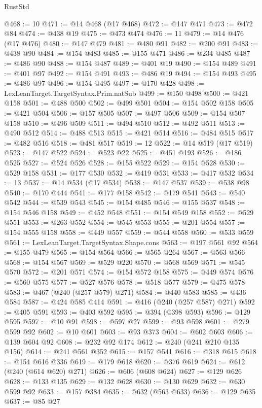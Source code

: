 \begin{lexlean}{RustStd}
\begin{coremodule}
@468 := 10
@471 := @14 @468 (@17 @468)
@472 := @147 @471
@473 := @472 @84
@474 := @438 @19
@475 := @473 @474
@476 := 11
@479 := @14 @476 (@17 @476)
@480 := @147 @479
@481 := @480 @91
@482 := @200 @91
@483 := @438 @90
@484 := @154 @483
@485 := @155 @471
@486 := @234 @485
@487 := @486 @90
@488 := @154 @487
@489 := @401 @19
@490 := @154 @489
@491 := @401 @97
@492 := @154 @491
@493 := @486 @19
@494 := @154 @493
@495 := @486 @97
@496 := @154 @495
@497 := @170 @428
@498 := LexLeanTarget.TargetSyntax.Prim.natSub
@499 := @150 @498
@500 := @421 @158
@501 := @488 @500
@502 := @499 @501
@504 := @154 @502 @158
@505 := @421 @504
@506 := @157 @505
@507 := @497 @506
@509 := @154 @507 @158
@510 := @496 @509
@511 := @494 @510
@512 := @492 @511
@513 := @490 @512
@514 := @488 @513
@515 := @421 @514
@516 := @484 @515
@517 := @482 @516
@518 := @481 @517
@519 := 12
@522 := @14 @519 (@17 @519)
@523 := @147 @522
@524 := @523 @22
@525 := @451 @193
@526 := @186 @525
@527 := @524 @526
@528 := @155 @522
@529 := @154 @528
@530 := @529 @158
@531 := @177 @530
@532 := @419 @531
@533 := @417 @532
@534 := 13
@537 := @14 @534 (@17 @534)
@538 := @147 @537
@539 := @538 @98
@540 := @170 @444
@541 := @177 @158
@542 := @179 @541
@543 := @540 @542
@544 := @539 @543
@545 := @154 @485
@546 := @155 @537
@548 := @154 @546 @158
@549 := @452 @548
@551 := @154 @549 @158
@552 := @529 @551
@553 := @263 @552
@554 := @545 @553
@555 := @201 @554
@557 := @154 @555 @158
@558 := @449 @557
@559 := @544 @558
@560 := @533 @559
@561 := LexLeanTarget.TargetSyntax.Shape.cons
@563 := @197 @561 @92
@564 := @155 @479
@565 := @154 @564
@566 := @565 @264
@567 := @563 @566
@568 := @154 @567
@569 := @529 @220
@570 := @568 @569
@571 := @545 @570
@572 := @201 @571
@574 := @154 @572 @158
@575 := @449 @574
@576 := @560 @575
@577 := @527 @576
@578 := @518 @577
@579 := @475 @578
@583 := @467 (@240 (@257 @579) @271)
@584 := @440 @583
@585 := @436 @584
@587 := @424 @585 @414
@591 := @416 (@240 (@257 @587) @271)
@592 := @405 @591
@593 := @403 @592
@595 := @394 (@398 @593)
@596 := @129 @595
@597 := @10 @91
@598 := @597 @27
@599 := @93 @598
@601 := @279 @599 @92
@602 := @10 @601
@603 := @93 @373
@604 := @602 @603
@606 := @139 @604 @92
@608 := @232 @92 @174
@612 := @240 (@241 @210 @135 @156)
@614 := @241 @561 @352
@615 := @157 @541
@616 := @318 @615
@618 := @154 @616 @336
@619 := @179 @618
@620 := @376 @619
@624 := @612 (@240 (@614 @620) @271)
@626 := @606 (@608 @624)
@627 := @129 @626
@628 := @133 @135
@629 := @132 @628
@630 := @130 @629
@632 := @630 @599 @92
@633 := @157 @384
@635 := @632 (@563 @633)
@636 := @129 @635
@637 := @85 @27

\end{coremodule}
\end{lexlean}
